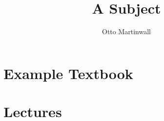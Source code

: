 

\title{A Subject}
\author{Otto Martinwall}


\maketitle
\tableofcontents
\newpage

\newtheorem{definition}{Definition}
\newtheorem{theorem}{Theorem}

\section{Example Textbook}


\section{Lectures}



